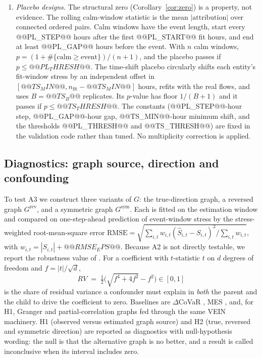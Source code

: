 \documentclass[referee,pdflatex,sn-mathphys-ay]{sn-jnl}
\theoremstyle{thmstyleone}%
\theoremstyle{thmstyletwo}%
\theoremstyle{thmstylethree}%
\begin{document}
\begin{enumerate}[label=(\alph*),leftmargin=*]
before each event hour, $R^2_{OS}(m)=1-\mathrm{SSE}(m)/\mathrm{SSE}(\text{expanding mean})$, pooled over
entity-hours of z-scored stress, following the out-of-sample convention of \citet{campbell2008predicting}.
The network gain over the own lag is $1-\mathrm{SSE}(m)/\mathrm{SSE}(\mathrm{AR})$. The models are
an AR(1) own lag, the network equation of \eqref{eq:fi} without an own lag, and AR plus network.
\item \emph{Placebo designs.} The structural zero (Corollary~\ref{cor:zero}) is a property, not evidence.
The rolling calm-window statistic is the mean $|\text{attribution}|$ over connected ordered pairs.
Calm windows have the event length, start every @@PL_STEP@@ hours after the first @@PL_START@@ fit hours, and
end at least @@PL_GAP@@ hours before the event. With $n$ calm windows, $p=(1+\#\{\text{calm}\ge\text{event}\})/(n+1)$,
and the placebo passes if $p\le@@PL_THRESH@@$. The time-shift placebo circularly shifts each entity's fit-window stress by an
independent offset in $[@@TS_MIN@@, n_{\text{fit}}-@@TS_MIN@@]$ hours, refits with the real flows, and uses
$B=@@TS_B@@$ replicates. Its $p$-value has floor $1/(B+1)$ and it passes if $p\le@@TS_THRESH@@$. The constants
(@@PL_STEP@@-hour step, @@PL_GAP@@-hour gap, @@TS_MIN@@-hour minimum shift, and the thresholds @@PL_THRESH@@ and @@TS_THRESH@@)
are fixed in the validation code rather than tuned. No multiplicity correction is applied.
\end{enumerate}

\subsection{Diagnostics: graph source, direction and confounding}
\label{subsec:design}
To test A3 we construct three variants of $G$: the true-direction graph, a reversed graph
$G^{\mathrm{rev}}$, and a symmetric graph $G^{\mathrm{sym}}$. Each is fitted on the
estimation window and compared on one-step-ahead prediction of event-window stress by the
stress-weighted root-mean-square error $\mathrm{RMSE}=\sqrt{\sum_{i,t} w_{i,t}(\hat S_{i,t}-S_{i,t})^2/\sum_{i,t} w_{i,t}}$,
with $w_{i,t}=|S_{i,t}|+@@RMSE_EPS@@$. Because A2 is not directly testable, we report the robustness
value of \citet{cinelli2020sensitivity}. For a coefficient with $t$-statistic $t$ on $d$
degrees of freedom and $f=|t|/\sqrt{d}$,
\begin{equation}
\label{eq:rv}
RV \;=\; \tfrac{1}{2}\Big(\sqrt{f^4+4f^2}-f^2\Big)\in[0,1]
\end{equation}
is the share of residual variance a confounder must explain in \emph{both} the parent and
the child to drive the coefficient to zero. Baselines are $\Delta$CoVaR \citep{adrian2016covar}, MES \citep{acharya2017measuring},
and, for H1, Granger and partial-correlation graphs \citep{granger1969,giudici2018corisk}
fed through the same VEIN machinery. H1 (observed versus estimated graph source) and H2 (true, reversed
and symmetric direction) are reported as diagnostics with null-hypothesis wording: the null is that the
alternative graph is no better, and a result is called inconclusive when its interval includes zero.
\end{document}
